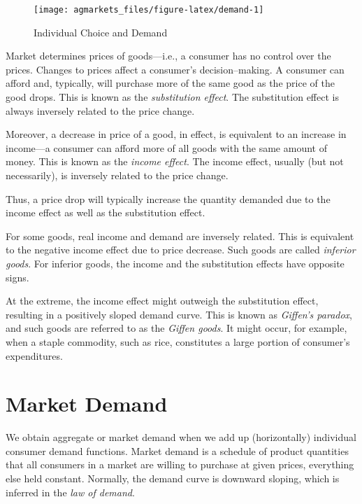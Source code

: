 \documentclass[
]{book}
\begin{document}
\begin{figure}

{\centering \texttt{[image: agmarkets\_files/figure-latex/demand-1]} 

}

\caption{Individual Choice and Demand}\label{fig:demand}
\end{figure}

Market determines prices of goods---i.e., a consumer has no control over the prices. Changes to prices affect a consumer's decision--making. A consumer can afford and, typically, will purchase more of the same good as the price of the good drops. This is known as the \emph{substitution effect}. The substitution effect is always inversely related to the price change.

Moreover, a decrease in price of a good, in effect, is equivalent to an increase in income---a consumer can afford more of all goods with the same amount of money. This is known as the \emph{income effect}. The income effect, usually (but not necessarily), is inversely related to the price change.

Thus, a price drop will typically increase the quantity demanded due to the income effect as well as the substitution effect.

For some goods, real income and demand are inversely related. This is equivalent to the negative income effect due to price decrease. Such goods are called \emph{inferior goods}. For inferior goods, the income and the substitution effects have opposite signs.

At the extreme, the income effect might outweigh the substitution effect, resulting in a positively sloped demand curve. This is known as \emph{Giffen's paradox}, and such goods are referred to as the \emph{Giffen goods}. It might occur, for example, when a staple commodity, such as rice, constitutes a large portion of consumer's expenditures.

\hypertarget{market-demand}{%
\section{Market Demand}\label{market-demand}}

We obtain aggregate or market demand when we add up (horizontally) individual consumer demand functions. Market demand is a schedule of product quantities that all consumers in a market are willing to purchase at given prices, everything else held constant. Normally, the demand curve is downward sloping, which is inferred in the \emph{law of demand}.
\end{document}
